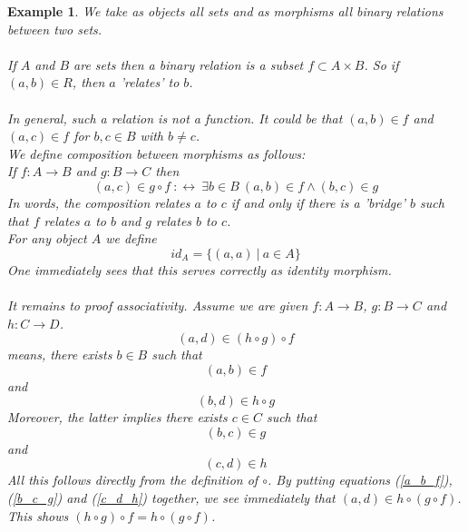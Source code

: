 \documentclass[17pt]{extarticle}
\newtheorem{example}{Example}
\begin{document}
	

\begin{example}
	We take as objects all sets and as morphisms all binary relations between two sets.\\ \\
	 If $A$ and $B$ are sets then a binary relation is a subset $f\subset A\times B$. So if $(a,b)\in R$, then $a$ 'relates' to $b$.\\ \\
	 In general, such a relation is not a function. It could be that $(a,b)\in f$ and $(a, c)\in f$ for $b,c\in B$ with $b\neq c$.\\ 
	 
	We define composition between morphisms as follows: \\
    If $f:A\rightarrow B$ and $g:B\rightarrow C$ then
	$$
	(a,c)\in g\circ f \ :\leftrightarrow \ \exists b\in B \ (a,b)\in f \wedge (b,c)\in g 
	$$
	In words, the composition relates $a$ to $c$ if and only if there is a 'bridge' $b$ such that $f$ relates $a$ to $b$ and $g$ relates $b$ to $c$.\\
	
    For any object $A$ we define
    $$id_A =\{(a,a) \ | \ a\in A\}$$
    One immediately sees that this serves correctly as identity morphism.\\ \\
    It remains to proof associativity. Assume we are given $f:A\rightarrow B$, $g:B\rightarrow C$ and $h:C\rightarrow D$.
    $$
    (a,d)\in (h\circ g)\circ f
    $$
    means, there exists $b\in B$ such that
    \begin{equation} \label{a_b_f}
    (a,b)\in f
    \end{equation}
    and
    $$(b,d)\in h\circ g$$
    Moreover, the latter implies there exists $c\in C$ such that
    \begin{equation} \label{b_c_g}
    (b,c)\in g
    \end{equation}
    and
    \begin{equation} \label{c_d_h}
    (c,d)\in h
    \end{equation}
    All this follows directly from the definition of $\circ$.
    By putting equations (\ref{a_b_f}), (\ref{b_c_g}) and (\ref{c_d_h}) together, we see immediately that $(a,d)\in h\circ (g\circ f)$.\\
    This shows $(h\circ g)\circ f=h\circ (g\circ f)$.    
\end{example}
\end{document}
